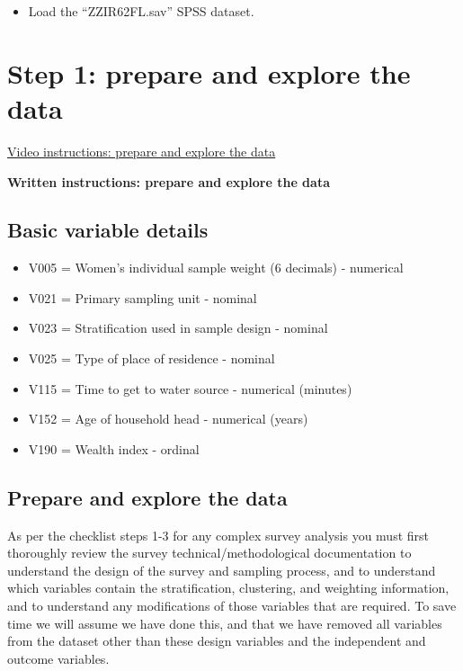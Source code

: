 \documentclass[
]{book}
\providecommand{\tightlist}{%
  \setlength{\itemsep}{0pt}\setlength{\parskip}{0pt}}
\begin{document}
\begin{itemize}
\tightlist
\item
  Load the ``ZZIR62FL.sav'' SPSS dataset.
\end{itemize}

\hypertarget{step-1-prepare-and-explore-the-data}{%
\section{Step 1: prepare and explore the data}\label{step-1-prepare-and-explore-the-data}}

\href{https://youtu.be/6gUS7-JTTnk}{Video instructions: prepare and explore the data}

\textbf{Written instructions: prepare and explore the data}

\hypertarget{basic-variable-details}{%
\subsection{Basic variable details}\label{basic-variable-details}}

\begin{itemize}
\item
  V005 = Women's individual sample weight (6 decimals) - numerical
\item
  V021 = Primary sampling unit - nominal
\item
  V023 = Stratification used in sample design - nominal
\item
  V025 = Type of place of residence - nominal
\item
  V115 = Time to get to water source - numerical (minutes)
\item
  V152 = Age of household head - numerical (years)
\item
  V190 = Wealth index - ordinal
\end{itemize}

\hypertarget{prepare-and-explore-the-data}{%
\subsection{Prepare and explore the data}\label{prepare-and-explore-the-data}}

As per the checklist steps 1-3 for any complex survey analysis you must first thoroughly review the survey technical/methodological documentation to understand the design of the survey and sampling process, and to understand which variables contain the stratification, clustering, and weighting information, and to understand any modifications of those variables that are required. To save time we will assume we have done this, and that we have removed all variables from the dataset other than these design variables and the independent and outcome variables.
\end{document}

